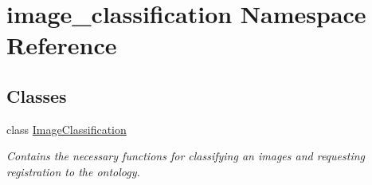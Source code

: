 \hypertarget{namespaceimage__classification}{\section{image\-\_\-classification Namespace Reference}
\label{namespaceimage__classification}
}
\subsection*{Classes}
\begin{DoxyCompactItemize}
\item 
class \hyperlink{classimage__classification_1_1ImageClassification}{Image\-Classification}
\begin{DoxyCompactList}\small\item\em Contains the necessary functions for classifying an images and requesting registration to the ontology. \end{DoxyCompactList}\end{DoxyCompactItemize}

